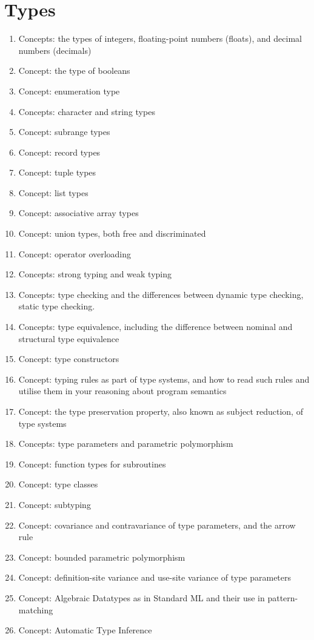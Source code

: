 \section{Types}\label{sec:Types}

\begin{enumerate}[noitemsep]
\item Concepts: the types of integers, floating-point numbers (floats), and decimal numbers (decimals)
\item Concept: the type of booleans
\item Concept: enumeration type
\item Concepts: character and string types
\item Concept: subrange types
\item Concept: record types
\item Concept: tuple types
\item Concept: list types
\item Concept: associative array types
\item Concept: union types, both free and discriminated
\item Concept: operator overloading
\item Concepts: strong typing and weak typing
\item Concepts: type checking and the differences between dynamic type checking, static type checking.
\item Concepts: type equivalence, including the difference between nominal and structural type equivalence
\item Concept: type constructors
\item Concept: typing rules as part of type systems, and how to read such rules and utilise them in your reasoning about program semantics
\item Concept: the type preservation property, also known as subject reduction, of type systems
\item Concepts: type parameters and parametric polymorphism
\item Concept: function types for subroutines
\item Concept: type classes
\item Concept: subtyping
\item Concept: covariance and contravariance of type parameters, and the arrow rule
\item Concept: bounded parametric polymorphism
\item Concept: definition-site variance and use-site variance of type parameters
\item Concept: Algebraic Datatypes as in Standard ML and their use in pattern-matching
\item Concept: Automatic Type Inference
\end{enumerate}

